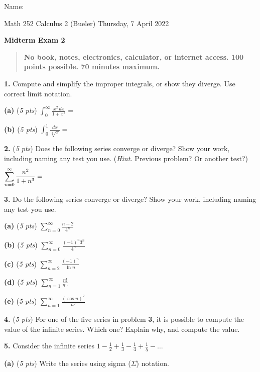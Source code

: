 \documentclass[11pt]{amsart}
\newcommand{\ds}{\displaystyle}
\newcommand{\prob}[1]{\bigskip\noindent\textbf{#1.} }
\newcommand{\pts}[1]{(\emph{#1 pts})}
\newcommand{\probpts}[2]{\prob{#1} \pts{#2} \quad}
\newcommand{\epartpts}[2]{\medskip\noindent \textbf{(#1)} \pts{#2} \quad}
\begin{document}
\hfill \Large Name:\underline{\phantom{Ed Bueler really really long long long name}}
\medskip

\scriptsize \noindent Math 252 Calculus 2 (Bueler) \hfill Thursday, 7 April 2022
\medskip

\LARGE\centerline{\textbf{Midterm Exam 2}}

\smallskip
\begin{quote}
\large
\textbf{No book, notes, electronics, calculator, or internet access.  100 points possible. 70 minutes maximum.}
\end{quote}

\normalsize
\medskip

\thispagestyle{empty}

\prob{1}  Compute and simplify the improper integrals, or show they diverge.  Use correct limit notation.

\epartpts{a}{5} $\ds \int_0^\infty \frac{x^2\, dx}{1+x^3} = $
\vfill

\epartpts{b}{5} $\ds \int_0^1 \frac{dx}{\sqrt[4]{x}} =$
\vfill

\probpts{2}{5}  Does the following series converge or diverge?  Show your work, including naming any test you use.  (\emph{Hint.}  Previous problem?  Or another test?)
  $$\sum_{n=0}^\infty \frac{n^2}{1+n^3} = \hspace{4.5in}$$
\vfill


\clearpage\newpage
\prob{3}  Do the following series converge or diverge?  Show your work, including naming any test you use.

\epartpts{a}{5}  $\ds \sum_{n=0}^\infty \frac{n+2}{4^n}$
\vfill

\epartpts{b}{5}  $\ds \sum_{n=0}^\infty \frac{(-1)^n 3^n}{4^n}$
\vfill

\epartpts{c}{5}  $\ds \sum_{n=2}^\infty \frac{(-1)^n}{\ln n}$
\vfill


\clearpage\newpage
\epartpts{d}{5}  $\ds \sum_{n=1}^\infty \frac{n!}{n^n}$
\vfill

\epartpts{e}{5}  $\ds \sum_{n=1}^\infty \frac{(\cos n)^2}{n^2}$
\vfill

\probpts{4}{5}  For one of the five series in problem \textbf{3}, it is possible to compute the value of the infinite series.  Which one?  Explain why, and compute the value.
\vfill


\clearpage\newpage
\prob{5}  Consider the infinite series $\ds 1-\frac{1}{2}+\frac{1}{3}-\frac{1}{4}+\frac{1}{5} - \dots$

\epartpts{a}{5}  Write the series using sigma ($\Sigma$) notation.
\vspace{2.0in}
\end{document}
